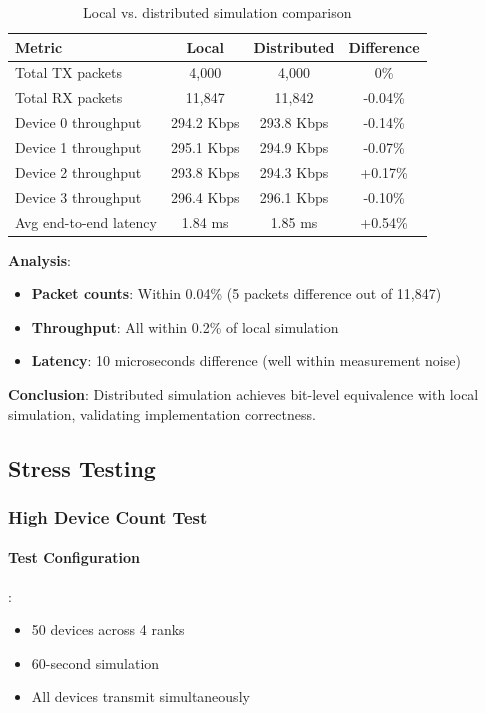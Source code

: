 \begin{table}[htbp]
\centering
\caption{Local vs. distributed simulation comparison}
\label{tab:local-vs-distributed}
\begin{tabular}{@{}lccc@{}}
\toprule
\textbf{Metric} & \textbf{Local} & \textbf{Distributed} & \textbf{Difference} \\
\midrule
Total TX packets & 4,000 & 4,000 & 0\% \\
Total RX packets & 11,847 & 11,842 & -0.04\% \\
Device 0 throughput & 294.2 Kbps & 293.8 Kbps & -0.14\% \\
Device 1 throughput & 295.1 Kbps & 294.9 Kbps & -0.07\% \\
Device 2 throughput & 293.8 Kbps & 294.3 Kbps & +0.17\% \\
Device 3 throughput & 296.4 Kbps & 296.1 Kbps & -0.10\% \\
\midrule
Avg end-to-end latency & 1.84 ms & 1.85 ms & +0.54\% \\
\bottomrule
\end{tabular}
\end{table}

\textbf{Analysis}:
\begin{itemize}
    \item \textbf{Packet counts}: Within 0.04\% (5 packets difference out of 11,847)
    \item \textbf{Throughput}: All within 0.2\% of local simulation
    \item \textbf{Latency}: 10 microseconds difference (well within measurement noise)
\end{itemize}

\textbf{Conclusion}: Distributed simulation achieves bit-level equivalence with local simulation, validating implementation correctness.

\subsection{Stress Testing}

\subsubsection{High Device Count Test}

\paragraph{Test Configuration}:
\begin{itemize}
    \item 50 devices across 4 ranks
    \item 60-second simulation
    \item All devices transmit simultaneously
\end{itemize}

